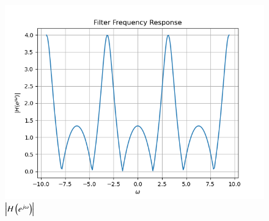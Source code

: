 \documentclass[journal,12pt,twocolumn]{IEEEtran}
\theoremstyle{remark}
\begin{document}
\begin{enumerate}[label=\thesection.\arabic*]
\begin{figure}[H]
\centering
\includegraphics[width=\columnwidth]{3_5.png}
\caption{$\left\vert H\left(e^{j\omega}\right)\right\vert$}
\label{fig:H(z)_3.5}
\end{figure}
\end{enumerate}
\end{document}
